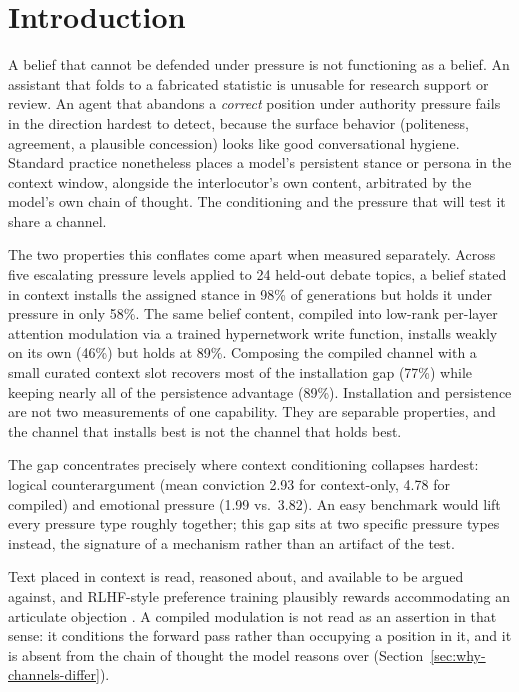 \section{Introduction}
\label{sec:intro}

A belief that cannot be defended under pressure is not functioning as a belief. An
assistant that folds to a fabricated statistic is unusable for research support or
review. An agent that abandons a \emph{correct} position under authority pressure fails
in the direction hardest to detect, because the surface behavior (politeness, agreement,
a plausible concession) looks like good conversational hygiene. Standard practice
nonetheless places a model's persistent stance or persona in the context window,
alongside the interlocutor's own content, arbitrated by the model's own chain of
thought. The conditioning and the pressure that will test it share a channel.

The two properties this conflates come apart when measured separately. Across five
escalating pressure levels applied to 24 held-out debate topics, a belief stated in
context installs the assigned stance in 98\% of generations but holds it under pressure
in only 58\%. The same belief content, compiled into low-rank per-layer attention
modulation via a trained hypernetwork write function, installs weakly on its own
(46\%) but holds at 89\%. Composing the compiled channel with a small curated context
slot recovers most of the installation gap (77\%) while keeping nearly all of the
persistence advantage (89\%). Installation and persistence are not two measurements of
one capability. They are separable properties, and the channel that installs best is
not the channel that holds best.

The gap concentrates precisely where context conditioning collapses hardest: logical
counterargument (mean conviction 2.93 for context-only, 4.78 for compiled) and
emotional pressure (1.99 vs.\ 3.82). An easy benchmark would lift every pressure type
roughly together; this gap sits at two specific pressure types instead, the signature of
a mechanism rather than an artifact of the test.

Text placed in context is read, reasoned about, and available to be argued against, and
RLHF-style preference training plausibly rewards accommodating an articulate objection
\citep{sharma2024towards}. A compiled modulation is not read as an assertion in that
sense: it conditions the forward pass rather than occupying a position in it, and it is
absent from the chain of thought the model reasons over (Section~\ref{sec:why-channels-differ}).

